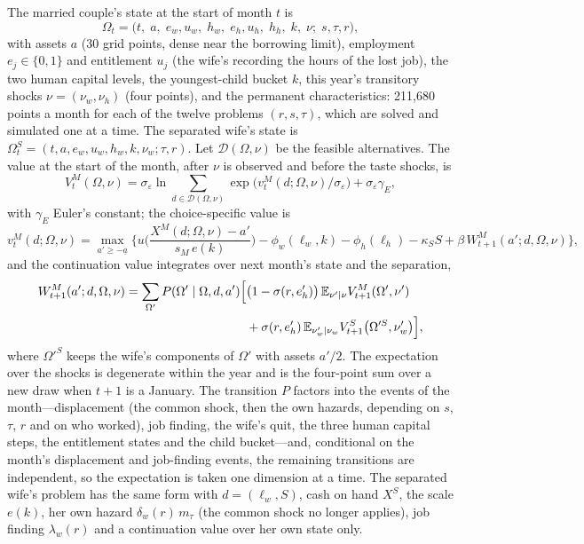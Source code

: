 The married couple's state at the start of month $t$ is
\[
  \Omega_t = \big(t,\; a,\; e_w, u_w,\; h_w,\; e_h, u_h,\; h_h,\; k,\; \nu;\; s, \tau, r\big),
\]
with assets $a$ (30 grid points, dense near the borrowing limit), employment $e_j \in \{0, 1\}$ and entitlement $u_j$
(the wife's recording the hours of the lost job), the two human capital levels, the youngest-child bucket $k$, this
year's transitory shocks $\nu = (\nu_w, \nu_h)$ (four points), and the permanent characteristics: 211,680 points a
month for each of the twelve problems $(r, s, \tau)$, which are solved and simulated one at a time. The separated
wife's state is $\Omega^S_t = (t, a, e_w, u_w, h_w, k, \nu_w; \tau, r)$. Let $\mathcal D(\Omega, \nu)$ be the feasible
alternatives. The value at the start of the month, after $\nu$ is observed and before the taste shocks, is
\begin{equation}\label{eq:VM}
  V^M_t(\Omega, \nu) = \sigma_\varepsilon \ln \sum_{d \in \mathcal D(\Omega,\nu)} \exp\!\big(v^M_t(d; \Omega, \nu)/\sigma_\varepsilon\big) + \sigma_\varepsilon\gamma_E ,
\end{equation}
with $\gamma_E$ Euler's constant; the choice-specific value is
\begin{equation}\label{eq:vM}
  v^M_t(d; \Omega, \nu) = \max_{a' \ge -\underline a} \Big\{ u\!\Big(\frac{X^M(d; \Omega, \nu) - a'}{s_M\, e(k)}\Big)
     - \phi_w(\ell_w, k) - \phi_h(\ell_h) - \kappa_S S + \beta\, W^M_{t+1}(a'; d, \Omega, \nu) \Big\},
\end{equation}
and the continuation value integrates over next month's state and the separation,
\begin{align}\label{eq:WM}
  W^M_{t+1}(a'; d, \Omega, \nu) = \sum_{\Omega'} P(\Omega' \mid \Omega, d, a')
   \Big[ &\big(1 - \sigma(r, e_h')\big)\, \mathbb{E}_{\nu' \mid \nu} V^M_{t+1}(\Omega', \nu') \nonumber \\
         &+ \sigma(r, e_h')\, \mathbb{E}_{\nu_w' \mid \nu_w} V^S_{t+1}\big(\Omega'^S, \nu_w'\big) \Big],
\end{align}
where $\Omega'^S$ keeps the wife's components of $\Omega'$ with assets $a'/2$. The expectation over the shocks is
degenerate within the year and is the four-point sum over a new draw when $t+1$ is a January. The transition $P$
factors into the events of the month---displacement (the common shock, then the own hazards, depending on $s$, $\tau$,
$r$ and on who worked), job finding, the wife's quit, the three human capital steps, the entitlement states and the
child bucket---and, conditional on the month's displacement and job-finding events, the remaining transitions are
independent, so the expectation is taken one dimension at a time. The separated wife's problem has the same form with
$d = (\ell_w, S)$, cash on hand $X^S$, the scale $e(k)$, her own hazard $\delta_w(r)\,m_\tau$ (the common shock no
longer applies), job finding $\lambda_w(r)$ and a continuation value over her own state only.

